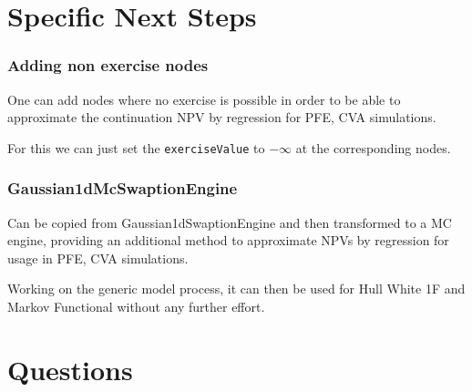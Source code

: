 \documentclass{beamer}
\begin{document}
\section{Specific Next Steps}

\begin{frame}[fragile]
\frametitle{Adding non exercise nodes}
One can add nodes where no exercise is possible in order to be able to approximate
the continuation NPV by regression for PFE, CVA simulations. 

For this we can just
set the \verb+exerciseValue+ to $-\infty$ at the corresponding nodes.
\end{frame}

\begin{frame}
\frametitle{Gaussian1dMcSwaptionEngine}
Can be copied from Gaussian1dSwaptionEngine and then transformed to a MC engine,
providing an additional method to approximate NPVs by regression for usage in PFE,
CVA simulations.

Working on the generic model process, it can then be used for Hull White 1F and
Markov Functional without any further effort.
\end{frame}

\section{Questions}

\end{document}
